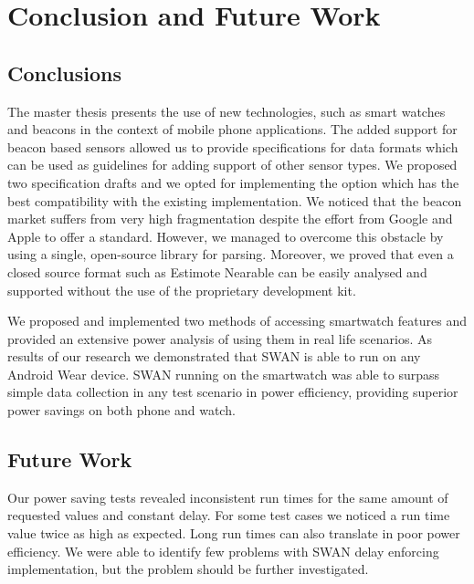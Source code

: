 
\chapter{Conclusion and Future Work} %

\label{Chapter7} %



\section{Conclusions}
The master thesis presents the use of new technologies, such as smart watches and beacons in the context of mobile phone applications. 
The added support for beacon based sensors allowed us to provide specifications for data formats which can be used as guidelines for adding support of other sensor types. We proposed two
specification drafts and we opted for implementing the option which has the best compatibility with the existing implementation.
We noticed that the beacon market suffers from very high fragmentation despite the effort from Google and Apple to offer a standard. However, we managed to overcome this obstacle by using
a single, open-source library for parsing. Moreover, we proved that even a closed source format such as Estimote Nearable can be easily analysed and supported without the use of the proprietary development kit.

We proposed and implemented two methods 
of accessing smartwatch features and provided an extensive power analysis of using them in real life scenarios. As results of our research we demonstrated that SWAN is able to run
on any Android Wear device. SWAN running on the smartwatch was able to surpass simple data collection in any test scenario in power efficiency,
providing superior power savings on both phone and watch.



\section{Future Work}
Our power saving tests revealed inconsistent run times for the same amount of requested values and constant delay. For some test cases we noticed a run time value twice as high as expected.
Long run times can also translate in poor power efficiency. We were able to identify few problems with SWAN delay enforcing implementation, but the problem should be further investigated.


